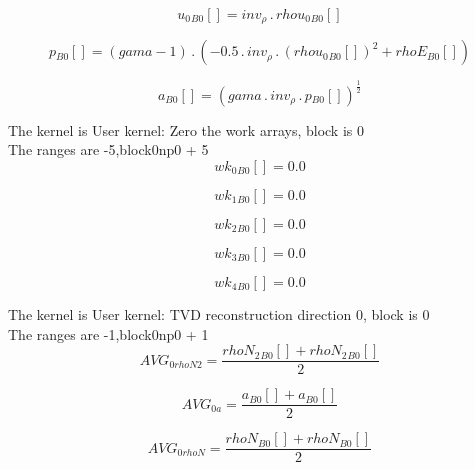 \documentclass{article}
\begin{document}
\begin{dmath}{u_{0}{_{B0}}}[{}] = inv_{\rho} \,.\, {rhou_{0}{_{B0}}}[{}]\end{dmath}

\begin{dmath}{p{_{B0}}}[{}] = \left(gama - 1\right) \,.\, \left(- 0.5 \,.\, inv_{\rho} \,.\, \left({rhou_{0}{_{B0}}}[{}] \right)^{2} + {rhoE{_{B0}}}[{}]\right)\end{dmath}

\begin{dmath}{a{_{B0}}}[{}] = \left(gama \,.\, inv_{\rho} \,.\, {p{_{B0}}}[{}] \right)^{\frac{1}{2}}\end{dmath}

\noindent The kernel is User kernel: Zero the work arrays, block is 0\\\noindent The ranges are -5,block0np0 + 5\\\begin{dmath}{wk_{0}{_{B0}}}[{}] = 0.0\end{dmath}

\begin{dmath}{wk_{1}{_{B0}}}[{}] = 0.0\end{dmath}

\begin{dmath}{wk_{2}{_{B0}}}[{}] = 0.0\end{dmath}

\begin{dmath}{wk_{3}{_{B0}}}[{}] = 0.0\end{dmath}

\begin{dmath}{wk_{4}{_{B0}}}[{}] = 0.0\end{dmath}

\noindent The kernel is User kernel: TVD reconstruction direction 0, block is 0\\\noindent The ranges are -1,block0np0 + 1\\\begin{dmath}AVG_{0 rhoN2} = \frac{{rhoN_{2}{_{B0}}}[{}] + {rhoN_{2}{_{B0}}}[{}]}{2}\end{dmath}

\begin{dmath}AVG_{0 a} = \frac{{a{_{B0}}}[{}] + {a{_{B0}}}[{}]}{2}\end{dmath}

\begin{dmath}AVG_{0 rhoN} = \frac{{rhoN{_{B0}}}[{}] + {rhoN{_{B0}}}[{}]}{2}\end{dmath}
\end{document}
